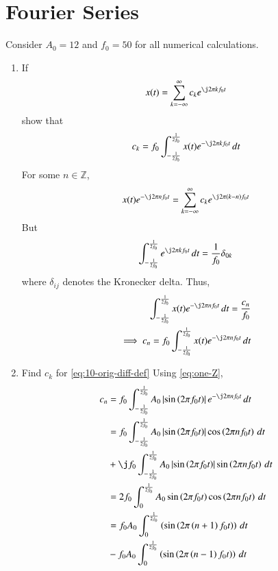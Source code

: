 \documentclass[journal,12pt,twocolumn]{IEEEtran}
\renewcommand\thesection{\arabic{section}}
\begin{document}
\section{Fourier Series}
Consider $A_0 =12$ and $f_0 = 50$ for all numerical calculations.
\begin{enumerate}[label=\thesection.\arabic*,ref=\thesection.\theenumi]
\item If
\begin{align}
	x(t) = \sum_{k = -\infty}^{\infty}c_ke^{\j2\pi kf_0 t}
\label{eq:one-Z-complex}
\end{align}
show that 
\begin{align}
	c_k = f_0\int_{-\frac{1}{2f_0}}^{\frac{1}{2f_0}}x(t)e^{-\j2\pi kf_0 t}\, dt
\label{eq:one-Z}
\end{align}
\solution For some $n \in \mathbb{Z}$,
\begin{align}
    x(t)e^{-\j2\pi nf_0t} = \sum_{k = -\infty}^{\infty}c_ke^{\j2\pi (k - n)f_0 t}
\end{align}
But
\begin{align}
    \int_{-\frac{1}{2f_0}}^{\frac{1}{2f_0}}e^{\j2\pi kf_0 t}\, dt = 
    \frac{1}{f_0}\delta_{0k}
\end{align}
where $\delta_{ij}$ denotes the Kronecker delta. Thus,
\begin{align}
    \int_{-\frac{1}{2f_0}}^{\frac{1}{2f_0}}x(t)e^{-\j2\pi nf_0 t}\, dt = 
    \frac{c_n}{f_0} \\
    \implies c_n = f_0\int_{-\frac{1}{2f_0}}^{\frac{1}{2f_0}}x(t)e^{-\j2\pi nf_0 t}\, dt 
\end{align}
\item Find $c_k$ for \eqref{eq:10-orig-diff-def}
\solution Using \eqref{eq:one-Z},
\begin{align}
    c_n &= f_0\int_{-\frac{1}{2f_0}}^{\frac{1}{2f_0}}A_0\abs{\sin\brak{2\pi f_0t}}
    e^{-\j2\pi nf_0t}\, dt \\
        &= f_0\int_{-\frac{1}{2f_0}}^{\frac{1}{2f_0}}A_0\abs{\sin\brak{2\pi f_0t}}
    \cos\brak{2\pi nf_0t}\, dt \nonumber \\
        &+ \j f_0\int_{-\frac{1}{2f_0}}^{\frac{1}{2f_0}}A_0
        \abs{\sin\brak{2\pi f_0t}}\sin\brak{2\pi nf_0t}\, dt \\
        &= 2f_0\int_{0}^{\frac{1}{2f_0}}A_0\sin\brak{2\pi f_0t}\cos\brak{2\pi nf_0t}\, dt \\
        &= f_0A_0\int_{0}^{\frac{1}{2f_0}}\brak{\sin\brak{2\pi\brak{n+1}f_0t}}\, dt \nonumber \\ 
        &- f_0A_0\int_{0}^{\frac{1}{2f_0}}\brak{\sin\brak{2\pi\brak{n-1}f_0t}}\, dt \\ 

\end{align}
\end{enumerate}
\end{document}
